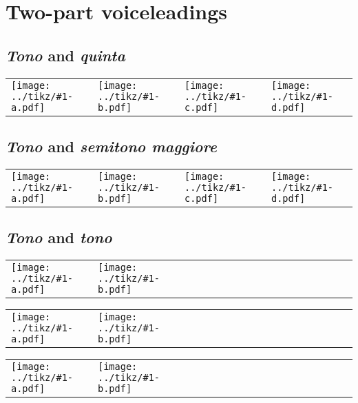 \documentclass[a4paper,DIV=17,11pt,headings=standardclasses]{scrartcl}
\def\fourLine#1{%
\begin{longtable}{p{0.25\linewidth}p{0.25\linewidth}p{0.25\linewidth}p{0.25\linewidth}}
  \texttt{[image: ../tikz/\#1-a.pdf]} &
  \texttt{[image: ../tikz/\#1-b.pdf]} &
  \texttt{[image: ../tikz/\#1-c.pdf]} &
  \texttt{[image: ../tikz/\#1-d.pdf]} \\
\end{longtable}
}
\def\twoLine#1{%
\begin{longtable}{p{0.25\linewidth}p{0.25\linewidth}p{0.25\linewidth}p{0.25\linewidth}}
  \texttt{[image: ../tikz/\#1-a.pdf]} &
  \texttt{[image: ../tikz/\#1-b.pdf]} &
\end{longtable}
}
\begin{document}
\pagebreak

\section{Two-part voiceleadings}
\subsection{\textit{Tono} and \textit{quinta}}
\fourLine{c001}

\subsection{\textit{Tono} and \textit{semitono maggiore}}
\fourLine{c002}

\subsection{\textit{Tono} and \textit{tono}}
\twoLine{c003}
\twoLine{c004}
\twoLine{c005}
\end{document}
